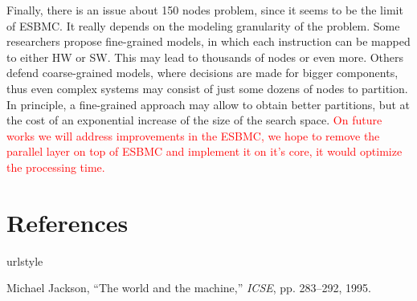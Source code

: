 Finally, there is an issue about 150 nodes problem, since it seems to be the limit of ESBMC. It really depends on the modeling granularity of the problem. Some researchers propose fine-grained models, in which each instruction can be mapped to either HW or SW. This may lead to thousands of nodes or even more. Others defend coarse-grained models, where decisions are made for bigger components, thus even complex systems may consist of just some dozens of nodes to partition. In principle, a fine-grained approach may allow to obtain better partitions, but at the cost of an exponential increase of the size of the search space. \textcolor{Red}{On future works we will address improvements in the ESBMC, we hope to remove the parallel layer on top of ESBMC and implement it on it's core, it would optimize the processing time.}
\section{References}

\begin{thebibliography}{5}
\providecommand{\natexlab}[1]{#1}
\providecommand{\url}[1]{{#1}}
\providecommand{\urlprefix}{URL }
\expandafter\ifx\csname urlstyle\endcsname\relax
  \providecommand{\doi}[1]{DOI~\discretionary{}{}{}#1}\else
  \providecommand{\doi}{DOI~\discretionary{}{}{}\begingroup
  \urlstyle{rm}\Url}\fi
\providecommand{\eprint}[2][]{\url{#2}}

Michael Jackson, ``{The world and the machine},'' {\em ICSE}, pp. 283--292, 1995.




\end{thebibliography}




